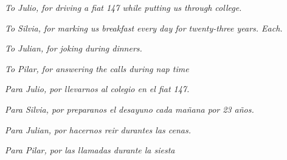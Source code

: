 \cleardoublepage

\begin{dedication}
\emph{To Julio, for driving a fiat 147 while putting us through college.}

\emph{To Silvia, for marking us breakfast every day for twenty-three years. Each.} 

\emph{To Julian, for joking during dinners.}

 \emph{To Pilar, for answering the calls during nap time\\}
 


\emph{Para Julio, por llevarnos al colegio en el fiat 147.}

\emph{Para Silvia, por preparanos el desayuno cada ma\~nana por 23 a\~nos.}

\emph{Para Julian, por hacernos reir durantes las cenas.}

\emph{Para Pilar, por las llamadas durante la siesta }
\end{dedication}


